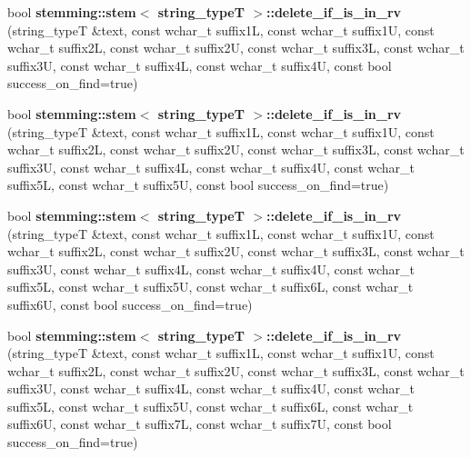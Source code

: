 \begin{DoxyCompactItemize}
\item 
\hypertarget{group___stemming_gaa14e355385422f170a184e1e2182c6b0}{bool {\bfseries stemming\-::stem$<$ string\-\_\-type\-T $>$\-::delete\-\_\-if\-\_\-is\-\_\-in\-\_\-rv} (string\-\_\-type\-T \&text, const wchar\-\_\-t suffix1\-L, const wchar\-\_\-t suffix1\-U, const wchar\-\_\-t suffix2\-L, const wchar\-\_\-t suffix2\-U, const wchar\-\_\-t suffix3\-L, const wchar\-\_\-t suffix3\-U, const wchar\-\_\-t suffix4\-L, const wchar\-\_\-t suffix4\-U, const bool success\-\_\-on\-\_\-find=true)}\label{group___stemming_gaa14e355385422f170a184e1e2182c6b0}

\item 
\hypertarget{group___stemming_gadb10d6f58dca24420ce2b1fd7e58928f}{bool {\bfseries stemming\-::stem$<$ string\-\_\-type\-T $>$\-::delete\-\_\-if\-\_\-is\-\_\-in\-\_\-rv} (string\-\_\-type\-T \&text, const wchar\-\_\-t suffix1\-L, const wchar\-\_\-t suffix1\-U, const wchar\-\_\-t suffix2\-L, const wchar\-\_\-t suffix2\-U, const wchar\-\_\-t suffix3\-L, const wchar\-\_\-t suffix3\-U, const wchar\-\_\-t suffix4\-L, const wchar\-\_\-t suffix4\-U, const wchar\-\_\-t suffix5\-L, const wchar\-\_\-t suffix5\-U, const bool success\-\_\-on\-\_\-find=true)}\label{group___stemming_gadb10d6f58dca24420ce2b1fd7e58928f}

\item 
\hypertarget{group___stemming_ga2102feb734da90e80172d1f34102c8cd}{bool {\bfseries stemming\-::stem$<$ string\-\_\-type\-T $>$\-::delete\-\_\-if\-\_\-is\-\_\-in\-\_\-rv} (string\-\_\-type\-T \&text, const wchar\-\_\-t suffix1\-L, const wchar\-\_\-t suffix1\-U, const wchar\-\_\-t suffix2\-L, const wchar\-\_\-t suffix2\-U, const wchar\-\_\-t suffix3\-L, const wchar\-\_\-t suffix3\-U, const wchar\-\_\-t suffix4\-L, const wchar\-\_\-t suffix4\-U, const wchar\-\_\-t suffix5\-L, const wchar\-\_\-t suffix5\-U, const wchar\-\_\-t suffix6\-L, const wchar\-\_\-t suffix6\-U, const bool success\-\_\-on\-\_\-find=true)}\label{group___stemming_ga2102feb734da90e80172d1f34102c8cd}

\item 
\hypertarget{group___stemming_gacc427221d55bf93e113f2811eedca74a}{bool {\bfseries stemming\-::stem$<$ string\-\_\-type\-T $>$\-::delete\-\_\-if\-\_\-is\-\_\-in\-\_\-rv} (string\-\_\-type\-T \&text, const wchar\-\_\-t suffix1\-L, const wchar\-\_\-t suffix1\-U, const wchar\-\_\-t suffix2\-L, const wchar\-\_\-t suffix2\-U, const wchar\-\_\-t suffix3\-L, const wchar\-\_\-t suffix3\-U, const wchar\-\_\-t suffix4\-L, const wchar\-\_\-t suffix4\-U, const wchar\-\_\-t suffix5\-L, const wchar\-\_\-t suffix5\-U, const wchar\-\_\-t suffix6\-L, const wchar\-\_\-t suffix6\-U, const wchar\-\_\-t suffix7\-L, const wchar\-\_\-t suffix7\-U, const bool success\-\_\-on\-\_\-find=true)}\label{group___stemming_gacc427221d55bf93e113f2811eedca74a}


\end{DoxyCompactItemize}
